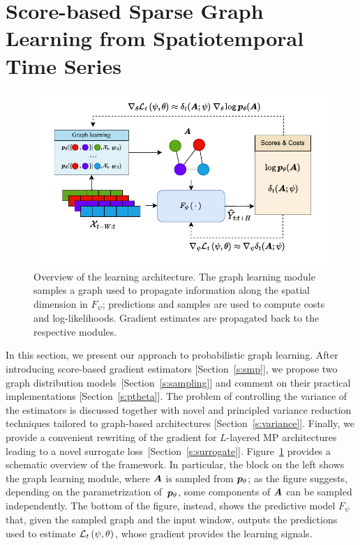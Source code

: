 \section{Score-based Sparse Graph Learning from Spatiotemporal Time Series}\label{s:lsd}

\begin{figure}
    \centering
    \includegraphics[scale=0.8]{imgs/graph-learning-small.pdf}
    \caption{Overview of the learning architecture. The graph learning module samples a graph used to propagate information along the spatial dimension in $F_\psi$; predictions and samples are used to compute costs and log-likelihoods. Gradient estimates are propagated back to the respective modules.}
    \label{fig:framework}
\end{figure}

In this section, we present our approach to probabilistic graph learning. After introducing score-based gradient estimators [Section~\ref{s:smp}], we propose two graph distribution models~[Section~\ref{s:sampling}] and comment on their practical implementations [Section~\ref{s:ptheta}]. The problem of controlling the variance of the estimators is discussed together with novel and principled variance reduction techniques tailored to graph-based architectures [Section~\ref{s:variance}]. Finally, we provide a convenient rewriting of the gradient for $L$-layered MP architectures leading to a novel surrogate loss~[Section~\ref{s:surrogate}]. Figure~\ref{fig:framework} provides a schematic overview of the framework. In particular, the block on the left shows the graph learning module, where ${\bm{A}}$ is sampled from ${{\bm{p}}_\theta}$; as the figure suggests, depending on the parametrization of~${{\bm{p}}_\theta}$, some components of ${\bm{A}}$ can be sampled independently. The bottom of the figure, instead, shows the predictive model $F_\psi$ that, given the sampled graph and the input window, outputs the predictions used to estimate $\mathcal{L}_t\left(\psi,\theta\right)$, whose gradient provides the learning signals.



